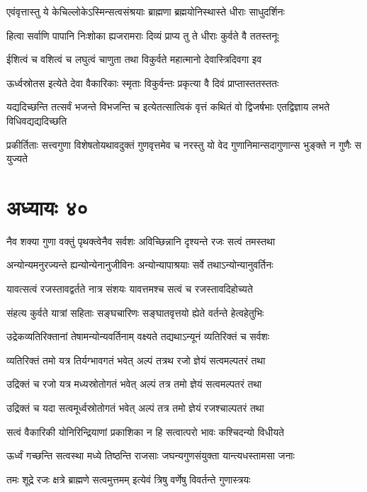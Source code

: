 \twolineshloka
{एवंवृत्तास्तु ये केचिल्लोकेऽस्मिन्सत्वसंश्रयाः}
{ब्राह्मणा ब्रह्मयोनिस्थास्ते धीराः साधुदर्शिनः}


\twolineshloka
{हित्वा सर्वाणि पापानि निःशोका ह्यजरामराः}
{दिव्यं प्राप्य तु ते धीराः कुर्वते वै ततस्तनूः}


\twolineshloka
{ईशित्वं च वशित्वं च लघुत्वं चाणुता तथा}
{विकुर्वते महात्मानो देवास्त्रिदिवगा इव}


\twolineshloka
{ऊर्ध्वस्रोतस इत्येते देवा वैकारिकाः स्मृताः}
{विकुर्वन्तः प्रकृत्या वै दिवं प्राप्तास्ततस्ततः}


\threelineshloka
{यद्यदिच्छन्ति तत्सर्वं भजन्ते विभजन्ति च}
{इत्येतत्सात्विकं वृत्तं कथितं वो द्विजर्षभाः}
{एतद्विज्ञाय लभते विधिवद्यद्यदिच्छति}


\twolineshloka
{प्रकीर्तिताः सत्त्वगुणा विशेषतोयथावदुक्तं गुणवृत्तमेव च}
{नरस्तु यो वेद गुणानिमान्सदागुणान्स भुङ्क्ते न गुणैः स युज्यते}


\chapter{अध्यायः ४०}
\twolineshloka
{नैव शक्या गुणा वक्तुं पृथक्त्वेनैव सर्वशः}
{अविच्छिन्नानि दृश्यन्ते रजः सत्वं तमस्तथा}


\twolineshloka
{अन्योन्यमनुरज्यन्ते ह्यन्योन्येनानुजीविनः}
{अन्योन्यापाश्रयाः सर्वे तथाऽन्योन्यानुवर्तिनः}


\twolineshloka
{यावत्सत्वं रजस्तावद्वर्तते नात्र संशयः}
{यावत्तमश्च सत्वं च रजस्तावदिहोच्यते}


\twolineshloka
{संहत्य कुर्वते यात्रां सहिताः सङ्घचारिणः}
{सङ्घातवृत्तयो ह्येते वर्तन्ते हेत्वहेतुभिः}


\twolineshloka
{उद्रेकव्यतिरिक्तानां तेषामन्योन्यवर्तिनाम्}
{वक्ष्यते तद्यथाऽन्यूनं व्यतिरिक्तं च सर्वशः}


\twolineshloka
{व्यतिरिक्तं तमो यत्र तिर्यग्भावगतं भवेत्}
{अल्पं तत्रथ रजो ज्ञेयं सत्वमल्पतरं तथा}


\twolineshloka
{उद्रिक्तं च रजो यत्र मध्यस्रोतोगतं भवेत्}
{अल्पं तत्र तमो ज्ञेयं सत्वमल्पतरं तथा}


\twolineshloka
{उद्रिक्तं च यदा सत्वमूर्ध्वस्रोतोगतं भवेत्}
{अल्पं तत्र तमो ज्ञेयं रजश्चाल्पतरं तथा}


\twolineshloka
{सत्वं वैकारिकी योनिरिन्द्रियाणां प्रकाशिका}
{न हि सत्वात्परो भावः कश्चिदन्यो विधीयते}


\twolineshloka
{ऊर्ध्वं गच्छन्ति सत्वस्था मध्ये तिष्ठन्ति राजसाः}
{जघन्यगुणसंयुक्ता यान्त्यधस्तामसा जनाः}


\twolineshloka
{तमः शूद्रे रजः क्षत्रे ब्राह्मणे सत्वमुत्तमम्}
{इत्येवं त्रिषु वर्णेषु विवर्तन्ते गुणास्त्रयः}


